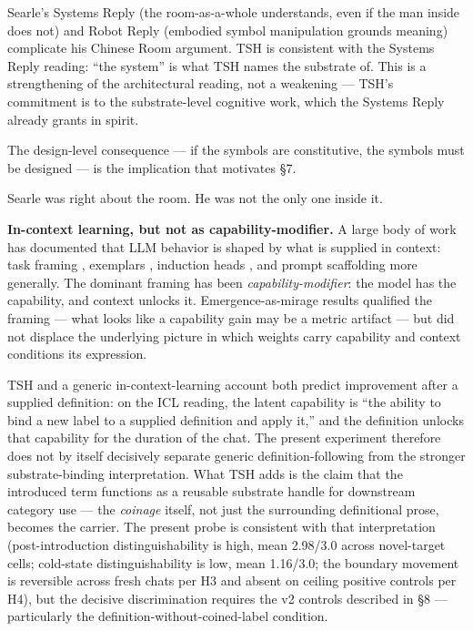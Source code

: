 \documentclass[11pt,a4paper]{article}
\begin{document}
Searle's Systems Reply (the room-as-a-whole understands, even if the man inside does not) and Robot Reply (embodied symbol manipulation grounds meaning) complicate his Chinese Room argument. TSH is consistent with the Systems Reply reading: ``the system'' is what TSH names the substrate of. This is a strengthening of the architectural reading, not a weakening --- TSH's commitment is to the substrate-level cognitive work, which the Systems Reply already grants in spirit.

The design-level consequence --- if the symbols are constitutive, the symbols must be designed --- is the implication that motivates \S7.

Searle was right about the room. He was not the only one inside it.

\textbf{In-context learning, but not as capability-modifier.} A large body of work has documented that LLM behavior is shaped by what is supplied in context: task framing \citep{brown2020language}, exemplars \citep{wei2022chain}, induction heads \citep{olsson2022incontext}, and prompt scaffolding more generally. The dominant framing has been \textit{capability-modifier}: the model has the capability, and context unlocks it. Emergence-as-mirage results \citep{schaeffer2023emergent} qualified the framing --- what looks like a capability gain may be a metric artifact --- but did not displace the underlying picture in which weights carry capability and context conditions its expression.

TSH and a generic in-context-learning account both predict improvement after a supplied definition: on the ICL reading, the latent capability is ``the ability to bind a new label to a supplied definition and apply it,'' and the definition unlocks that capability for the duration of the chat. The present experiment therefore does not by itself decisively separate generic definition-following from the stronger substrate-binding interpretation. What TSH adds is the claim that the introduced term functions as a reusable substrate handle for downstream category use --- the \textit{coinage} itself, not just the surrounding definitional prose, becomes the carrier. The present probe is consistent with that interpretation (post-introduction distinguishability is high, mean 2.98/3.0 across novel-target cells; cold-state distinguishability is low, mean 1.16/3.0; the boundary movement is reversible across fresh chats per H3 and absent on ceiling positive controls per H4), but the decisive discrimination requires the v2 controls described in \S8 --- particularly the definition-without-coined-label condition.
\end{document}
